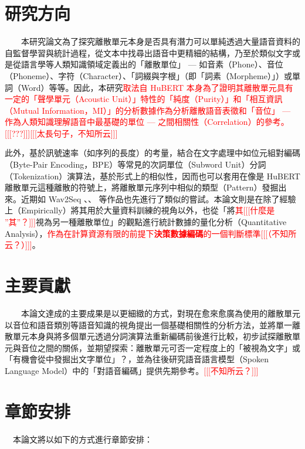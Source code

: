 \section{研究方向}

　　本研究論文為了探究離散單元本身是否具有潛力可以單純透過大量語音資料的自監督學習與統計過程，從文本中找尋出語音中更精細的結構，乃至於類似文字或是從語言學等人類知識領域定義出的「離散單位」 --- 如音素（Phone）、音位（Phoneme）、字符（Character）、「詞綴與字根」（即「詞素（Morpheme）」）或單詞（Word）等等。因此，本研究\textcolor{red}{取法自 HuBERT 本身為了證明其離散單元具有一定的「聲學單元（Acoustic Unit）」特性的「純度（Purity）」和「相互資訊（Mutual Information，MI）」的分析數據作為分析離散語音表徵和「音位」 --- 作為人類知識理解語音中最基礎的單位 --- 之間相關性（Correlation）的參考。[[[???]]][[[太長句子，不知所云]]]}

        此外，基於訊號速率（如序列的長度）的考量，結合在文字處理中如位元組對編碼（Byte-Pair Encoding，BPE）等常見的次詞單位（Subword Unit）分詞（Tokenization）演算法，基於形式上的相似性，因而也可以套用在像是 HuBERT離散單元這種離散的符號上，將離散單元序列中相似的類型（Pattern）發掘出來。近期如 Wav2Seq \cite{wu_wav2seq_2023}、\cite{ren_speech_2022}、\cite{chang_exploring_2024} 等作品也先進行了類似的嘗試。本論文則是在除了經驗上（Empirically）將其用於大量資料訓練的視角以外，也從「將\textcolor{red}{其[[[什麼是 ''其''？]]]}視為另一種離散單位」的觀點進行統計數據的量化分析（Quantitative Analysis），\textcolor{red}{作為在計算資源有限的前提下\textbf{決策數據編碼}的一個判斷標準[[[（不知所云？）]]]}。

\section{主要貢獻}

　　本論文達成的主要成果是以更細緻的方式，對現在愈來愈廣為使用的離散單元以音位和語音類別等語音知識的視角提出一個基礎相關性的分析方法，並將單一離散單元本身與將多個單元透過分詞演算法重新編碼前後進行比較，初步試探離散單元與音位之間的關係，並期望探索：離散單元可否一定程度上的「被視為文字」或「有機會從中發掘出文字單位」？，並為往後研究語音語言模型（Spoken Language Model）中的「對語音編碼」提供先期參考。\textcolor{red}{[[[不知所云？]]]}

\section{章節安排}

　本論文將以如下的方式進行章節安排：


